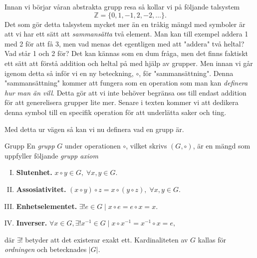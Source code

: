 \documentclass{article}
\theoremstyle{definition}
\begin{document}
Innan vi börjar våran abstrakta grupp resa så kollar vi på följande talsystem
\[ \mathbb{Z} = \{0, 1, -1, 2, -2, \ldots\}. \]
Det som gör detta talsystem mycket mer än en tråkig mängd med symboler är att 
vi har ett sätt att \textit{sammansätta} två element. Man kan till exempel 
addera 1 med 2 för att få 3, men vad menas det egentligen med att "addera" två heltal? Vad står 1 och 2 för? Det kan kännas som en dum fråga, men det finns faktiskt ett sätt 
att förstå addition och heltal på med hjälp av grupper. Men innan vi går igenom detta så inför vi en ny beteckning, $\circ$, för "sammansättning". Denna "sammansättning" kommer 
att fungera som en operation som man kan \textit{definera hur man än vill}. Detta gör att vi inte behöver begränsa oss till endast addition för att generelisera grupper lite mer. 
Senare i texten kommer vi att dedikera denna symbol till en specifik operation för att underlätta saker och ting. 

Med detta ur vägen så kan vi nu definera vad en grupp är. 

\hypertarget{def4.1}{}
\begin{mydef}{Grupp}{}
  En \textit{grupp} $G$ under operationen $\circ$, vilket skrivs $(G, \circ)$,
  är en mängd som uppfyller följande \textit{grupp axiom}
  \begin{enumerate}[I)] 
    \item \textbf{Slutenhet.} $x \circ y \in G, \; \forall x, y \in G.$ 
    \item \textbf{Assosiativitet.} $(x \circ y) \circ z = x \circ (y \circ z), \; \forall x, y \in G.$
    \item \textbf{Enhetselementet.} $\exists! e \in G \; | \; x \circ e = e \circ x = x.$
    \item \textbf{Inverser.} $\forall x \in G, \exists ! x^{-1} \in G \; | \; x \circ x^{-1}
    = x^{-1} \circ x = e,$
  \end{enumerate}
  där $\exists !$ betyder att det existerar exakt ett. Kardinaliteten av $G$ kallas 
  för \textit{ordningen} och betecknades $|G|$.
\end{mydef}
\end{document}
